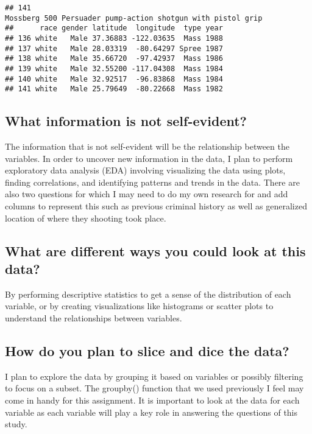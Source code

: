 \documentclass[
]{article}
\begin{document}
\begin{verbatim}
## 141                                                                                                                                                                                   Mossberg 500 Persuader pump-action shotgun with pistol grip
##      race gender latitude  longitude  type year
## 136 white   Male 37.36883 -122.03635  Mass 1988
## 137 white   Male 28.03319  -80.64297 Spree 1987
## 138 white   Male 35.66720  -97.42937  Mass 1986
## 139 white   Male 32.55200 -117.04308  Mass 1984
## 140 white   Male 32.92517  -96.83868  Mass 1984
## 141 white   Male 25.79649  -80.22668  Mass 1982
\end{verbatim}

\subsection{What information is not
self-evident?}\label{what-information-is-not-self-evident}

The information that is not self-evident will be the relationship
between the variables. In order to uncover new information in the data,
I plan to perform exploratory data analysis (EDA) involving visualizing
the data using plots, finding correlations, and identifying patterns and
trends in the data. There are also two questions for which I may need to
do my own research for and add columns to represent this such as
previous criminal history as well as generalized location of where they
shooting took place.

\subsection{What are different ways you could look at this
data?}\label{what-are-different-ways-you-could-look-at-this-data}

By performing descriptive statistics to get a sense of the distribution
of each variable, or by creating visualizations like histograms or
scatter plots to understand the relationships between variables.

\subsection{How do you plan to slice and dice the
data?}\label{how-do-you-plan-to-slice-and-dice-the-data}

I plan to explore the data by grouping it based on variables or possibly
filtering to focus on a subset. The groupby() function that we used
previously I feel may come in handy for this assignment. It is important
to look at the data for each variable as each variable will play a key
role in answering the questions of this study.
\end{document}
